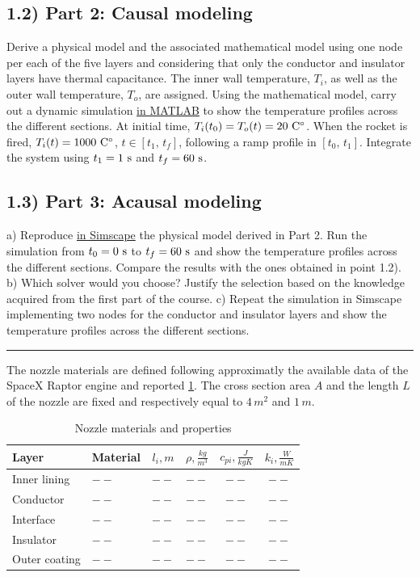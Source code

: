 \documentclass[11pt,a4paper,oneside]{article}
\begin{document}
\subsection*{1.2) Part 2: Causal modeling}
Derive a physical model and the associated mathematical model using one node per each of the five layers and considering that only the conductor and insulator layers have thermal capacitance.
The inner wall temperature, $T_i$, as well as the outer wall temperature, $T_o$, are assigned.
Using the mathematical model, carry out a dynamic simulation \underline{in MATLAB} to show the temperature profiles across the different sections.
At initial time, $T_i(t_0)=T_o(t) = 20\ {\rm C^\circ}$. When the rocket is fired, $T_i(t) = 1000\ {\rm C^\circ}$, $t\in[t_1,\,t_f]$, following a ramp profile in $[t_0,\,t_1]$.
Integrate the system using $t_1 = 1\ {\rm s}$ and $t_f = 60\ {\rm s}$.

\subsection*{1.3) Part 3: Acausal modeling}
a) Reproduce \underline{in Simscape} the physical model derived in Part 2. Run the simulation from $t_0 = 0\ {\rm s}$ to $t_f = 60\ {\rm s}$ and show the temperature profiles across the different sections. Compare the results with the ones obtained in point 1.2). 
b) Which solver would you choose? Justify the selection based on the knowledge acquired from the first part of the course.
c) Repeat the simulation in Simscape implementing two nodes for the conductor and insulator layers and show the temperature profiles across the different sections.
\medskip

\medskip \hrule \medskip
{}

The nozzle materials are defined following approximatly the available data of the SpaceX Raptor engine and reported \cref{tab:ex1_material}.
The cross section area $A$ and the length $L$ of the nozzle are fixed and respectively equal to $4\,m^2$ and $1\,m$.
\begin{table}[ht]
    \centering
    \caption{\label{tab:ex1_material} Nozzle materials and properties}
    \begin{tabular}{llcccc}
        \toprule
        \toprule
        Layer &  Material & $l_i, m$ & $\rho, \frac{kg}{m^3}$ & $c_{pi}, \frac{J}{kgK}$ & $k_i, \frac{W}{mK}$  \\ 
        \midrule
        Inner lining    & $--$ & $--$ & $--$ & $--$ & $--$ \\ 
        Conductor       & $--$ & $--$ & $--$ & $--$ & $--$ \\ 
        Interface       & $--$ & $--$ & $--$ & $--$ & $--$ \\ 
        Insulator       & $--$ & $--$ & $--$ & $--$ & $--$ \\ 
        Outer coating   & $--$ & $--$ & $--$ & $--$ & $--$ \\ 
        \bottomrule
        \bottomrule
    \end{tabular}
\end{table}
\end{document}
